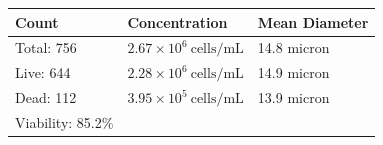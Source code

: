 \documentclass[UTF8,10pt,a4paper,fontset=fandol]{ctexart}
\renewcommand{\arraystretch}{1.15}
\newcommand{\fieldvalue}[1]{#1}
\begin{document}
\begin{center}
\begin{center}
\medskip
\renewcommand{\arraystretch}{1.15}
\begin{tabularx}{\textwidth}{@{}X X X@{}}
\textbf{Count} & \textbf{Concentration} & \textbf{Mean Diameter} \\
\hline
Total:
\fieldvalue{756}
&
\fieldvalue{$2.67\times10^{6}\ \mathrm{cells/mL}$}
&
\fieldvalue{14.8 micron}
\\
Live:
\fieldvalue{644}
&
\fieldvalue{$2.28\times10^{6}\ \mathrm{cells/mL}$}
&
\fieldvalue{14.9 micron}
\\
Dead:
\fieldvalue{112}
&
\fieldvalue{$3.95\times10^{5}\ \mathrm{cells/mL}$}
&
\fieldvalue{13.9 micron}
\\
Viability:
\fieldvalue{85.2\%}
&
&
\end{tabularx}

\medskip

\noindent
\begin{minipage}[t]{0.48\textwidth}
\centering
\fbox{\rule{0pt}{0.25\textheight}\rule{0.95\linewidth}{0pt}}
\end{minipage}
\hfill
\begin{minipage}[t]{0.48\textwidth}
\centering
\fbox{\rule{0pt}{0.25\textheight}\rule{0.95\linewidth}{0pt}}
\end{minipage}

\medskip

\noindent
\begin{minipage}[t]{0.48\textwidth}
\centering
\fbox{\rule{0pt}{0.25\textheight}\rule{0.95\linewidth}{0pt}}
\end{minipage}
\hfill
\begin{minipage}[t]{0.48\textwidth}
\centering
\fbox{\rule{0pt}{0.25\textheight}\rule{0.95\linewidth}{0pt}}
\end{minipage}


\end{center}
\end{center}
\end{document}
